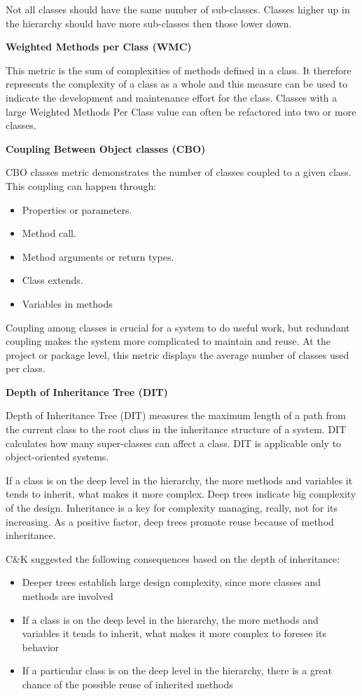 Not all classes should have the same number of sub-classes. Classes higher up in the hierarchy should have more sub-classes then those lower down.


\textbf{Weighted Methods per Class (WMC)}

This metric is the sum of complexities of methods defined in a class. It therefore represents the
complexity of a class as a whole and this measure can be used to indicate the development and
maintenance effort for the class. Classes with a large Weighted Methods Per Class value can often be refactored into two or more classes.

\textbf{Coupling Between Object classes (CBO)}

CBO classes metric demonstrates the number of classes coupled to a given class. This coupling can happen through:
\begin{itemize}
	\item Properties or parameters. 
	\item Method call. 
	\item Method arguments or return types.
	\item Class extends.
	\item Variables in methods
\end{itemize}

Coupling among classes is crucial for a system to do useful work, but redundant coupling makes the system more complicated to maintain and reuse. At the project or package level, this metric displays the average number of classes used per class.

\textbf{Depth of Inheritance Tree (DIT)}

Depth of Inheritance Tree (DIT) measures the maximum length of a path from the current class to the root class in the inheritance structure of a system. DIT calculates how many super-classes can affect a class. DIT is applicable only to object-oriented systems.

If a class is on the deep level in the hierarchy, the more methods and variables it tends to inherit, what makes it more complex. Deep trees indicate big complexity of the design. Inheritance is a key for complexity managing, really, not for its increasing. As a positive factor, deep trees promote reuse because of method inheritance.

C\&K suggested the following consequences based on the depth of inheritance:
\begin{itemize}
	\item Deeper trees establish large design complexity, since more classes and methods are involved
	\item If a class is on the deep level in the hierarchy, the more methods and variables it tends to inherit, what makes it more complex to foresee its behavior
	\item If a particular class is on the deep level in the hierarchy, there is a great chance of the possible reuse of inherited methods 
\end{itemize}

